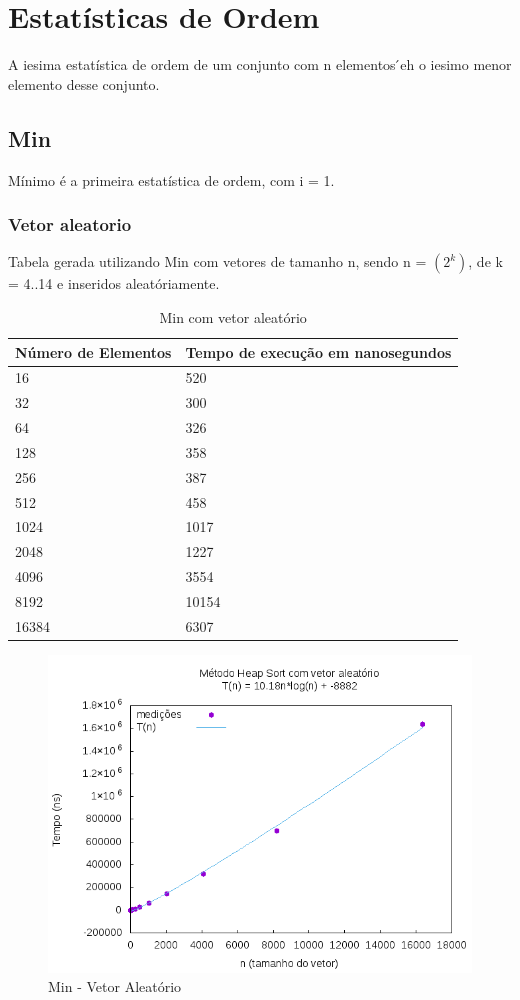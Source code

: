 \documentclass[12pt,a4paper,twoside]{report}
\begin{document}
\chapter{Estatísticas de Ordem}

A iesima estatística de ordem de um conjunto com n elementos ́eh o iesimo menor elemento desse conjunto.

\section{Min}

Mínimo é a primeira estatística de ordem, com i = 1.

\subsection{Vetor aleatorio}
Tabela gerada utilizando Min com vetores de tamanho n, sendo n = $(2^k)$, de k = 4..14 e inseridos aleatóriamente.
\begin{table}[H]
\centering
\caption{Min com vetor aleatório}
\label{my-label}
\begin{tabular}{|l|l|}
\hline
\multicolumn{1}{|c|}{\textbf{Número de Elementos}} & \multicolumn{1}{c|}{\textbf{Tempo de execução em nanosegundos}} \\ \hline
16 & 520 \\ \hline
32 & 300 \\ \hline
64 & 326 \\ \hline
128 & 358 \\ \hline
256 & 387 \\ \hline
512 & 458 \\ \hline
1024 & 1017 \\ \hline
2048 & 1227 \\ \hline
4096 & 3554 \\ \hline
8192 & 10154 \\ \hline
16384 & 6307 \\ \hline

\end{tabular}
\end{table}

\begin{figure}[H]
    \centering
    \includegraphics[width=0.7\linewidth]{graficos/HeapSort/vIntAleatorio/vIntAleatorio.png}
  \caption{Min - Vetor Aleatório}
\end{figure}
\end{document}
